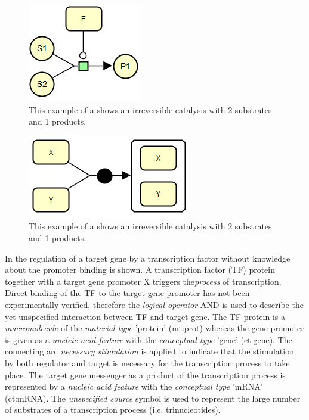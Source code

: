 \begin{figure}[htb]
  \centering
  \vspace*{-0.75em}
  \includegraphics[scale=0.5]{images/Fig12}
  \caption{This example of a \PD shows an irreversible catalysis with 2 substrates and 1 products.}
  \label{fig:eg2}
\end{figure}

\begin{figure}[htb]
  \centering
  \vspace*{-0.75em}
  \includegraphics[scale=0.5]{images/Fig13}
  \caption{This example of a \PD shows an irreversible catalysis with 2 substrates and 1 products.}
  \label{fig:eg3}
\end{figure}

In  the regulation of a target gene by a transcription factor without knowledge about the promoter binding is shown. A transcription factor (TF) protein together with a target gene promoter X triggers the\emph{process} of transcription. Direct binding of the TF to the target gene promoter has not been experimentally verified, therefore the \emph{logical operator} AND is used to describe the yet unspecified interaction between TF and target gene. The TF protein is a \emph{macromolecule} of the \emph{material type} 'protein' (mt:prot) whereas the gene promoter is given as a \emph{nucleic acid feature} with the \emph{conceptual type} 'gene' (ct:gene). The connecting arc \emph{necessary stimulation} is applied to indicate that the stimulation by both regulator and target is necessary for the transcription process to take place. The target gene messenger as a product of the transcription process is represented by a \emph{nucleic acid feature} with the \emph{conceptual type} 'mRNA' (ct:mRNA). The \emph{unspecified source} symbol is used to represent the large number of substrates of a transcription process (i.e. trinucleotides).

